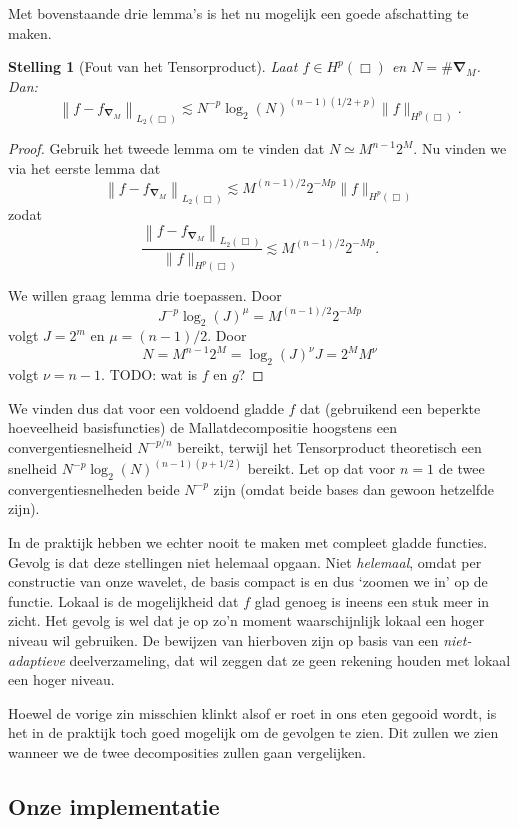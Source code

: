 \documentclass[11pt]{report}
\theoremstyle{plain}
\newtheorem{stelling}{Stelling}
\theoremstyle{definition}
\theoremstyle{remark}
\begin{document}
Met bovenstaande drie lemma's is het nu mogelijk een goede afschatting te maken. 
\begin{stelling}[Fout van het Tensorproduct]
  Laat $f \in H^p(\Box)$ en $N = \#\boldsymbol{\nabla}_M$. Dan:
  \[
    \left\| f - f_{\boldsymbol\nabla_M} \right\|_{L_2(\Box)} \lesssim N^{-p} \log_2(N)^{(n-1)(1/2 + p)} \| f \|_{H^p(\Box)}.
  \]
\end{stelling}
\begin{proof}
  Gebruik het tweede lemma om te vinden dat $N \simeq M^{n-1}2^M$. Nu vinden we via het eerste lemma dat
  \[
    \left\| f - f_{\boldsymbol\nabla_M} \right\|_{L_2(\Box)} \lesssim M^{(n-1)/2}2^{-Mp}\| f \|_{H^p(\Box)}
  \]
  zodat
  \[
    \frac{\left\| f - f_{\boldsymbol\nabla_M}  \right\|_{L_2(\Box)}}{\| f \|_{H^p(\Box)}} \lesssim M^{(n-1)/2}2^{-Mp}.
  \]

  We willen graag lemma drie toepassen. Door
  \[
    J^{-p}\log_2(J)^\mu = M^{(n-1)/2} 2^{-Mp}
  \]
  volgt $J = 2^m$ en $\mu = (n-1)/2$. Door
  \[
    N = M^{n-1}2^M = \log_2(J)^\nu J = 2^M M^\nu
  \] volgt $\nu = n-1$. TODO: wat is $f$ en $g$?
\end{proof}

We vinden dus dat voor een voldoend gladde $f$ dat (gebruikend een beperkte hoeveelheid basisfuncties) de Mallatdecompositie hoogstens een convergentiesnelheid $N^{-p/n}$ bereikt, terwijl het Tensorproduct theoretisch een snelheid $N^{-p} \log_2(N)^{(n-1)(p+1/2)}$ bereikt. Let op dat voor $n=1$ de twee convergentiesnelheden beide $N^{-p}$ zijn (omdat beide bases dan gewoon hetzelfde zijn).

In de praktijk hebben we echter nooit te maken met compleet gladde functies. Gevolg is dat deze stellingen niet helemaal opgaan. Niet \emph{helemaal}, omdat per constructie van onze wavelet, de basis compact is en dus `zoomen we in' op de functie. Lokaal is de mogelijkheid dat $f$ glad genoeg is ineens een stuk meer in zicht. Het gevolg is wel dat je op zo'n moment waarschijnlijk lokaal een hoger niveau wil gebruiken. De bewijzen van hierboven zijn op basis van een \emph{niet-adaptieve} deelverzameling, dat wil zeggen dat ze geen rekening houden met lokaal een hoger niveau.

Hoewel de vorige zin misschien klinkt alsof er roet in ons eten gegooid wordt, is het in de praktijk toch goed mogelijk om de gevolgen te zien. Dit zullen we zien wanneer we de twee decomposities zullen gaan vergelijken.

\subsection{Onze implementatie}
\end{document}
